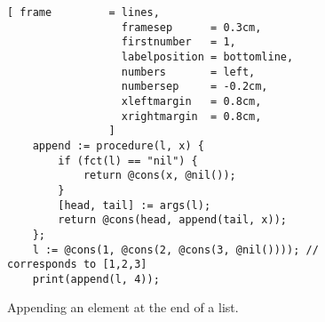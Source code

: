 \begin{figure}[!ht]
\centering
\begin{Verbatim}[ frame         = lines, 
                  framesep      = 0.3cm, 
                  firstnumber   = 1,
                  labelposition = bottomline,
                  numbers       = left,
                  numbersep     = -0.2cm,
                  xleftmargin   = 0.8cm,
                  xrightmargin  = 0.8cm,
                ]
    append := procedure(l, x) {
        if (fct(l) == "nil") {
            return @cons(x, @nil());  
        }
        [head, tail] := args(l);
        return @cons(head, append(tail, x));
    };
    l := @cons(1, @cons(2, @cons(3, @nil()))); // corresponds to [1,2,3]
    print(append(l, 4));
\end{Verbatim}
\vspace*{-0.3cm}
\caption{Appending an element at the end of a list.}
\label{fig:append.stlx}
\end{figure}

